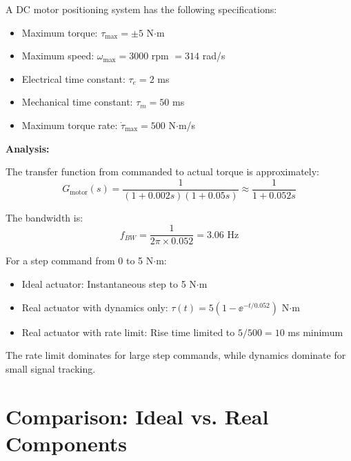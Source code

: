 \begin{examplebox}[title=Example 2.3: DC Motor Actuator Limitations]
A DC motor positioning system has the following specifications:
\begin{itemize}
    \item Maximum torque: $\tau_{\max} = \pm 5$ N$\cdot$m
    \item Maximum speed: $\omega_{\max} = 3000$ rpm $= 314$ rad/s
    \item Electrical time constant: $\tau_e = 2$ ms
    \item Mechanical time constant: $\tau_m = 50$ ms
    \item Maximum torque rate: $\dot{\tau}_{\max} = 500$ N$\cdot$m/s
\end{itemize}

\textbf{Analysis:}

The transfer function from commanded to actual torque is approximately:
\begin{equation}
G_{\text{motor}}(s) = \frac{1}{(1 + 0.002s)(1 + 0.05s)} \approx \frac{1}{1 + 0.052s}
\end{equation}

The bandwidth is:
\begin{equation}
f_{BW} = \frac{1}{2\pi \times 0.052} = 3.06 \text{ Hz}
\end{equation}

For a step command from 0 to 5 N$\cdot$m:
\begin{itemize}
    \item Ideal actuator: Instantaneous step to 5 N$\cdot$m
    \item Real actuator with dynamics only: $\tau(t) = 5(1 - \ee^{-t/0.052})$ N$\cdot$m
    \item Real actuator with rate limit: Rise time limited to $5/500 = 10$ ms minimum
\end{itemize}

The rate limit dominates for large step commands, while dynamics dominate for small signal tracking.
\end{examplebox}



\section{Comparison: Ideal vs. Real Components}
\label{sec:comparison}

